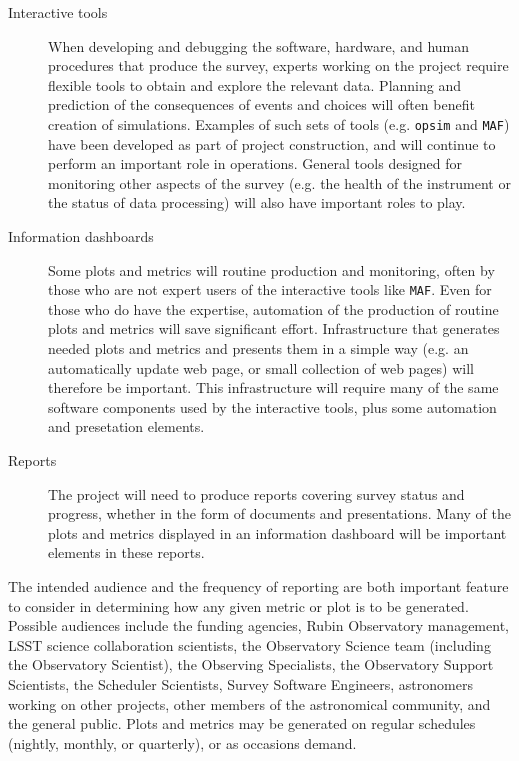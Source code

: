 \begin{description}
\item[{Interactive tools}] When developing and debugging the software, hardware, and human procedures that produce the survey, experts working on the project require flexible tools to obtain and explore the relevant data. Planning and prediction of the consequences of events and choices will often benefit creation of simulations. Examples of such sets of tools (e.g. \texttt{opsim} and \texttt{MAF}) have been developed as part of project construction, and will continue to perform an important role in operations. General tools designed for monitoring other aspects of the survey (e.g. the health of the instrument or the status of data processing) will also have important roles to play.
\item[{Information dashboards}] Some plots and metrics will routine production and monitoring, often by those who are not expert users of the interactive tools like \texttt{MAF}. Even for those who do have the expertise, automation of the production of routine plots and metrics will save significant effort. Infrastructure that generates needed plots and metrics and presents them in a simple way (e.g. an automatically update web page, or small collection of web pages) will therefore be important. This infrastructure will require many of the same software components used by the interactive tools, plus some automation and presetation elements.
\item[{Reports}] The project will need to produce reports covering survey status and progress, whether in the form of documents and presentations. Many of the plots and metrics displayed in an information dashboard will be important elements in these reports.
\end{description}

The intended audience and the frequency of reporting are both important feature to consider in determining how any given metric or plot is to be generated.
Possible audiences include the funding agencies, Rubin Observatory management, LSST science collaboration scientists, the Observatory Science team (including the Observatory Scientist), the Observing Specialists, the Observatory Support Scientists, the Scheduler Scientists, Survey Software Engineers, astronomers working on other projects, other members of the astronomical community, and the general public. 
Plots and metrics may be generated on regular schedules (nightly, monthly, or quarterly), or as occasions demand.


